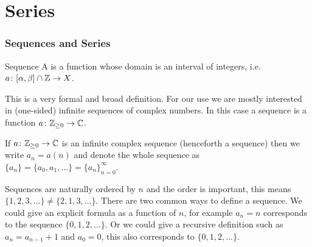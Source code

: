 \documentclass{article}
\newcommand{\intersection}{\cap}
\begin{document}
    \part{Series}
    \section{Sequences and Series}
    \begin{definition}{Sequence}{}
        A  is a function whose domain is an interval of integers, i.e. \(a\colon[\alpha, \beta]\intersection\integers\to X\).
    \end{definition}
    This is a very formal and broad definition.
    For our use we are mostly interested in (one-sided) infinite sequences of complex numbers.
    In this case a sequence is a function \(a\colon \mathbb{Z}_{\ge0} \to \mathbb{C}\).
    
    \begin{notation*}{}
        If \(a\colon\mathbb{Z}_{\ge0}\to\mathbb{C}\) is an infinite complex sequence (henceforth a sequence) then we write \(a_n = a(n)\) and denote the whole sequence as \(\{a_n\} = \{a_0, a_1, \dotsc\} = \{a_n\}_{n=0}^{\infty}\).
    \end{notation*}
    Sequences are naturally ordered by \(n\) and the order is important, this means \(\{1, 2, 3, \dotsc\}\ne \{2, 1, 3, \dotsc\}\).
    There are two common ways to define a sequence.
    We could give an explicit formula as a function of \(n\), for example \(a_n = n\) corresponds to the sequence \(\{0, 1, 2, \dotsc\}\).
    Or we could give a recursive definition such as \(a_n = a_{n-1} + 1\) and \(a_0 = 0\), this also corresponds to \(\{0, 1, 2, \dotsc\}\).
    
\end{document}
